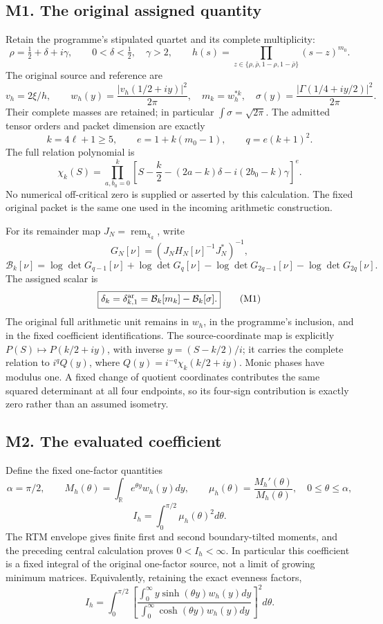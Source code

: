 \subsection{M1. The original assigned
quantity}\label{sa:m1.-the-original-assigned-quantity}

Retain the programme's stipulated quartet and its complete multiplicity:
\[
\rho=\tfrac12+\delta+i\gamma,\qquad 0<\delta<\tfrac12,\quad\gamma>2,
\qquad h(s)=\prod_{z\in\{\rho,\bar\rho,1-\rho,1-\bar\rho\}}(s-z)^{m_0}.
\] The original source and reference are \[
v_h=2\xi/h,\qquad w_h(y)=\frac{|v_h(1/2+iy)|^2}{2\pi},
\quad m_k=w_h^{*k},\quad
\sigma(y)=\frac{|\Gamma(1/4+iy/2)|^2}{2\pi}.
\] Their complete masses are retained; in particular
\(\int\sigma=\sqrt{2\pi}\). The admitted tensor orders and packet
dimension are exactly \[
k=4\ell+1\ge5,\qquad e=1+k(m_0-1),\qquad q=e(k+1)^2.
\] The full relation polynomial is \[
\chi_k(S)=\prod_{a,b_0=0}^k
\left[S-\frac k2-(2a-k)\delta-i(2b_0-k)\gamma\right]^e.
\] No numerical off-critical zero is supplied or asserted by this
calculation. The fixed original packet is the same one used in the
incoming arithmetic construction.

For its remainder map \(J_N=\operatorname{rem}_{\chi_k}\), write \[
G_N[\nu]=(J_NH_N[\nu]^{-1}J_N^*)^{-1},
\] \[
\mathcal B_k[\nu]=\log\det G_{q-1}[\nu]+\log\det G_q[\nu]
-\log\det G_{2q-1}[\nu]-\log\det G_{2q}[\nu].
\] The assigned scalar is \[
\boxed{\delta_k=\delta_{k,1}^{\rm ar}
=\mathcal B_k[m_k]-\mathcal B_k[\sigma].}\tag{M1}
\] The original full arithmetic unit remains in \(w_h\), in the
programme's inclusion, and in the fixed coefficient identifications. The
source-coordinate map is explicitly \(P(S)\mapsto P(k/2+iy)\), with
inverse \(y=(S-k/2)/i\); it carries the complete relation to
\(i^qQ(y)\), where \(Q(y)=i^{-q}\chi_k(k/2+iy)\). Monic phases have
modulus one. A fixed change of quotient coordinates contributes the same
squared determinant at all four endpoints, so its four-sign contribution
is exactly zero rather than an assumed isometry.

\subsection{M2. The evaluated
coefficient}\label{sa:m2.-the-evaluated-coefficient}

Define the fixed one-factor quantities \[
\alpha=\pi/2,\qquad M_h(\theta)=\int_{\mathbb R}e^{\theta y}w_h(y)dy,
\qquad \mu_h(\theta)=\frac{M_h'(\theta)}{M_h(\theta)},
\quad0\le\theta\le\alpha,
\] \[
\boxed{I_h=\int_0^{\pi/2}\mu_h(\theta)^2d\theta.}\tag{M2}
\] The RTM envelope gives finite first and second boundary-tilted
moments, and the preceding central calculation proves \(0<I_h<\infty\).
In particular this coefficient is a fixed integral of the original
one-factor source, not a limit of growing minimum matrices.
Equivalently, retaining the exact evenness factors, \[
I_h=\int_0^{\pi/2}
\left[
\frac{\int_0^\infty y\sinh(\theta y)w_h(y)dy}
{\int_0^\infty \cosh(\theta y)w_h(y)dy}
\right]^2d\theta.
\tag{M3}
\]

